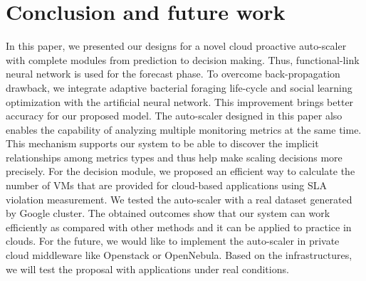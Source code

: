 \documentclass[runningheads]{llncs}
\begin{document}
%

\section{Conclusion and future work}
\label{conclusion}

In this paper, we presented our designs for a novel cloud proactive auto-scaler with complete modules from prediction to decision making. Thus, functional-link neural network is used for the forecast phase. To overcome back-propagation drawback, we integrate adaptive bacterial foraging life-cycle and social learning optimization with the artificial neural network. This improvement brings better accuracy for our proposed model. The auto-scaler designed in this paper also enables the capability of analyzing multiple monitoring metrics at the same time. This mechanism supports our system to be able to discover the implicit relationships among metrics types and thus help make scaling decisions more precisely. For the decision module, we proposed an efficient way to calculate the number of VMs that are provided for cloud-based applications using SLA violation measurement. We tested the auto-scaler with a real dataset generated by Google cluster. The obtained outcomes show that our system can work efficiently as compared with other methods and it can be applied to practice in clouds. For the future, we would like to implement the auto-scaler in private cloud middleware like Openstack or OpenNebula. Based on the infrastructures, we will test the proposal with applications under real conditions.
\end{document}

